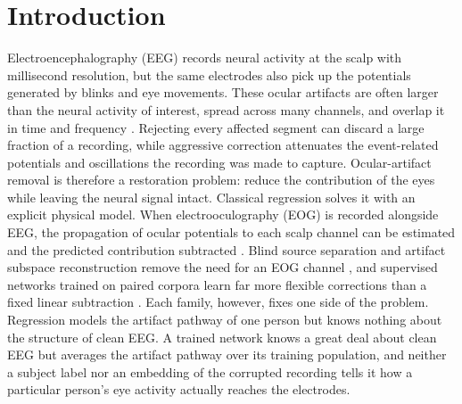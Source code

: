 \section{Introduction}
\label{sec:introduction}

Electroencephalography (EEG) records neural activity at the scalp with millisecond resolution, but the same electrodes also pick up the potentials generated by blinks and eye movements. These ocular artifacts are often larger than the neural activity of interest, spread across many channels, and overlap it in time and frequency \cite{croft2000ocular}. Rejecting every affected segment can discard a large fraction of a recording, while aggressive correction attenuates the event-related potentials and oscillations the recording was made to capture. Ocular-artifact removal is therefore a restoration problem: reduce the contribution of the eyes while leaving the neural signal intact. Classical regression solves it with an explicit physical model. When electrooculography (EOG) is recorded alongside EEG, the propagation of ocular potentials to each scalp channel can be estimated and the predicted contribution subtracted \cite{gratton1983ocular,semlitsch1986ocular}. Blind source separation and artifact subspace reconstruction remove the need for an EOG channel \cite{jung2000bss,chang2020asr}, and supervised networks trained on paired corpora learn far more flexible corrections than a fixed linear subtraction \cite{zhang2021eegdenoisenet,yu2022deepseparator}. Each family, however, fixes one side of the problem. Regression models the artifact pathway of one person but knows nothing about the structure of clean EEG. A trained network knows a great deal about clean EEG but averages the artifact pathway over its training population, and neither a subject label nor an embedding of the corrupted recording tells it how a particular person's eye activity actually reaches the electrodes.

